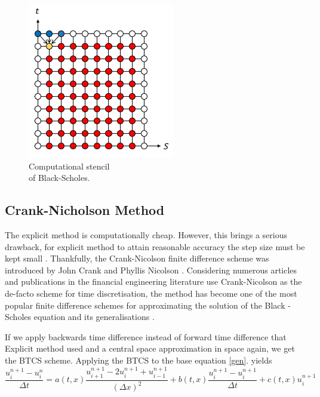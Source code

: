 \documentclass[12pt, oneside]{book}
\theoremstyle{plain}
\theoremstyle{definition}
\begin{document}
\begin{figure}[!htb]
\begin{minipage}[b]{0.5\textwidth}
    \includegraphics[width=\textwidth]{ExplicitBS.png}
    \caption{Computational stencil \\of Black-Scholes.}
  \end{minipage}
\end{figure}

\subsection{Crank-Nicholson Method}
The explicit method is computationally cheap. However, this brings a serious drawback, for explicit method to attain reasonable accuracy the step size must be kept small \cite{gdsmith}. Thankfully, the Crank-Nicolson finite difference scheme was introduced by John Crank and Phyllis Nicolson \cite{cn}. Considering numerous articles and publications in the financial engineering literature use Crank-Nicolson as the de-facto scheme for time discretisation, the method has become one of the most popular finite difference schemes for approximating the solution of the Black - Scholes equation and its generalisations \cite{tavella}.

 If we apply backwards time difference instead of forward time difference that Explicit method used and a central space approximation in space again, we get the BTCS scheme. Applying the BTCS to the base equation \ref{gen}. yields
    \begin{equation}
\frac{u^{n+1}_i - u^n_i}{\Delta t}  = a(t, x)  \frac{u^{n+1}_{i+1}- 2u^{n+1}_i + u^{n+1}_{i-1}}{(\Delta x)^2}  + b(t, x)  \frac{u^{n+1}_i - u^{n+1}_i}{\Delta t}  + c(t, x)  u^{n+1}_i
\end{equation}
\end{document}
